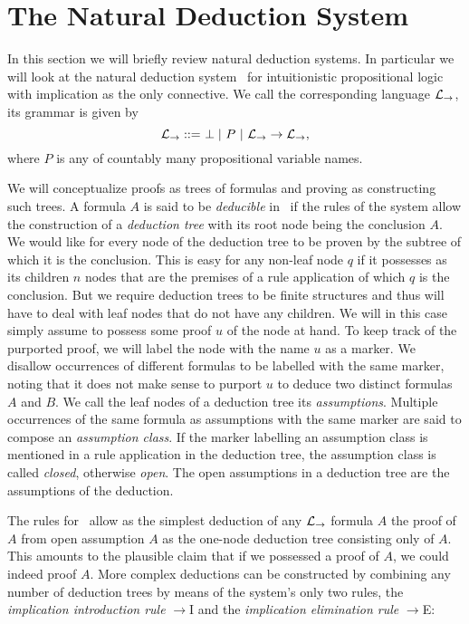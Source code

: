 \section{The Natural Deduction System \implnpi}
\label{sec:naturaldeduction}


In this section we will briefly review natural deduction systems. In particular
we will look at the natural deduction system \implnpi\ for intuitionistic
propositional logic with implication as the only connective. We call the
corresponding language $\mathcal{L}_\to$, its grammar is given by
$$\mathcal{L}_\to ::=\ \perp |\ P\ |\ \mathcal{L}_\to \to \mathcal{L}_\to,$$
where $P$ is any of countably many propositional variable names.

We will conceptualize proofs as trees of formulas and proving as constructing
such trees. A formula $A$ is said to be \textit{deducible} in \implnpi\ if the
rules of the system allow the construction of a \textit{deduction tree} with its
root node being the conclusion $A$. We would like for every node of the
deduction tree to be proven by the subtree of which it is the conclusion. This
is easy for any non-leaf node $q$ if it possesses as its children $n$ nodes that
are the premises of a rule application of which $q$ is the conclusion. But we
require deduction trees to be finite structures and thus will have to deal with
leaf nodes that do not have any children. We will in this case simply assume to
possess some proof $u$ of the node at hand. To keep track of the purported
proof, we will label the node with the name $u$ as a marker. We disallow
occurrences of different formulas to be labelled with the same marker, noting
that it does not make sense to purport $u$ to deduce two distinct formulas $A$
and $B$. We call the leaf nodes of a deduction tree its \textit{assumptions}.
Multiple occurrences of the same formula as assumptions with the same marker are
said to compose an \textit{assumption class}. If the marker labelling an
assumption class is mentioned in a rule application in the deduction tree, the
assumption class is called \textit{closed}, otherwise \textit{open}. The open
assumptions in a deduction tree are the assumptions of the deduction.

The rules for \implnpi\ allow as the simplest deduction of any $\mathcal{L}_\to$ formula
$A$ the proof of $A$ from open assumption $A$ as the one-node deduction tree
consisting only of $A$. This amounts to the plausible claim that if we possessed
a proof of $A$, we could indeed proof $A$. More complex deductions can be
constructed by combining any number of deduction trees by means of the system's
only two rules, the \textit{implication introduction rule} $\to$I and the
\textit{implication elimination rule} $\to$E:

